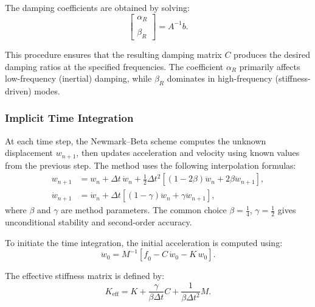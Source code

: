 \documentclass{article}
\begin{document}
	The damping coefficients are obtained by solving:
	\begin{equation}
		\begin{bmatrix}
			\alpha_R \\\\
			\beta_R
		\end{bmatrix}
		=
		{A}^{-1}{b}.
	\end{equation}
	
	This procedure ensures that the resulting damping matrix \( {C} \) produces the desired damping ratios at the specified frequencies. The coefficient \( \alpha_R \) primarily affects low-frequency (inertial) damping, while \( \beta_R \) dominates in high-frequency (stiffness-driven) modes.
	
	
\subsubsection{Implicit Time Integration}
	At each time step, the Newmark--Beta scheme computes the unknown displacement \( \mathit{{w}}_{n+1} \), then updates acceleration and velocity using known values from the previous step. The method uses the following interpolation formulas:
	\begin{align}
		\mathit{{w}}_{n+1} &= \mathit{{w}}_n + \Delta t\, \dot{\mathit{{w}}}_n + \frac{1}{2} \Delta t^2 \left[ (1 - 2\beta) \ddot{\mathit{{w}}}_n + 2\beta \ddot{\mathit{{w}}}_{n+1} \right], \\
		\dot{\mathit{{w}}}_{n+1} &= \dot{\mathit{{w}}}_n + \Delta t \left[ (1 - \gamma) \ddot{\mathit{{w}}}_n + \gamma \ddot{\mathit{{w}}}_{n+1} \right],
	\end{align}
	where \( \beta \) and \( \gamma \) are method parameters. The common choice \( \beta = \tfrac{1}{4} \), \( \gamma = \tfrac{1}{2} \) gives unconditional stability and second-order accuracy.
	
	To initiate the time integration, the initial acceleration is computed using:
	\begin{equation}
		\ddot{\mathit{{w}}}_0 = \mathit{{M}}^{-1} \left[ \mathit{{f}}_0 - \mathit{{C}}\, \dot{\mathit{{w}}}_0 - \mathit{{K}}\, \mathit{{w}}_0 \right].
	\end{equation}
	
	The effective stiffness matrix is defined by:
	\begin{equation}
		\mathit{{K}}_{\text{eff}} = \mathit{{K}} + \frac{\gamma}{\beta \Delta t} \mathit{{C}} + \frac{1}{\beta \Delta t^2} \mathit{{M}}.
	\end{equation}
	
\end{document}
